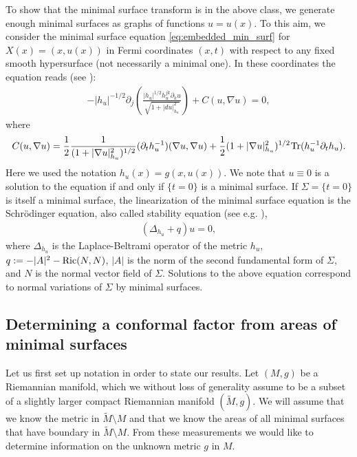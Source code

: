 \documentclass[11pt]{amsart}
\theoremstyle{definition}
\numberwithin{equation}{section}
\newcommand{\abs}[1]{\lvert #1 \rvert}          %
\newcommand{\p}{\partial}
\newcommand{\s}{\hspace{0.5pt}}
\begin{document}
To show that the minimal surface transform is in the above class, we generate enough minimal surfaces  as graphs of functions $u=u(x)$. To this aim, we consider the minimal surface equation \eqref{eq:embedded_min_surf} for $X(x)=(x,u(x))$  in Fermi coordinates $(x,t)$ with respect to any fixed smooth hypersurface (not necessarily a minimal one). In these coordinates the equation reads (see \cite{carstea2024calder}):
\begin{eqnarray}
\label{eq: MSE}
-|h_u|^{-1/2} \p_j \left( \frac{ |h_u|^{1/2} h_u^{jk} \p_k u}{\sqrt{1+|du|_{h_u}^2}} \right) + C(u, \nabla u) = 0, %
\end{eqnarray}
where \[
 C(u,\nabla u)=\frac{1}{2}\frac{1}{(1+\abs{\nabla u}^2_{h_u})^{1/2}}(\p_th_u^{-1})(\nabla u,\nabla u)+\frac{1}{2}(1+\abs{\nabla u}^2_{h_u})^{1/2}\s \text{Tr}(h_u^{-1}\p_th_u).
\]  
Here we used the notation $h_u(x)=g(x,u(x))$. We note that $u\equiv 0$ is a solution to the equation if and only if $\{t=0\}$ is a minimal surface. If $\Sigma=\{t=0\}$ is itself a minimal surface, the linearization of the minimal surface equation is the Schr\"odinger equation, also called stability equation (see e.g. \cite{MR2780140}), 
\begin{eqnarray}
\label{eq: stability equation}
( \Delta_{h_u} + q)u = 0, %
\end{eqnarray}
where $\Delta_{h_u}$ is the Laplace-Beltrami operator of the metric $h_u$, $q := -|A|^2 -{\rm Ric}(N,N)$, $|A|$ is the norm of the second fundamental form of $\Sigma$, and $N$ is the normal vector field of $\Sigma$. Solutions to the above equation correspond to normal variations of $\Sigma$ by minimal surfaces. %


 


\subsection{Determining a conformal factor from areas of minimal surfaces}

Let us first set up notation in order to state our results. Let $(M,g)$ be a Riemannian manifold, which we without loss of generality assume to be a subset of a slightly larger compact Riemannian manifold $(\widetilde{M},g)$.  We will assume that we know the metric in $\widetilde{M} \setminus M$ and that we know the areas of all minimal surfaces that have boundary in $\widetilde{M} \setminus M$. From these measurements we would like to determine information on the unknown metric $g$ in $M$. 
\end{document}
